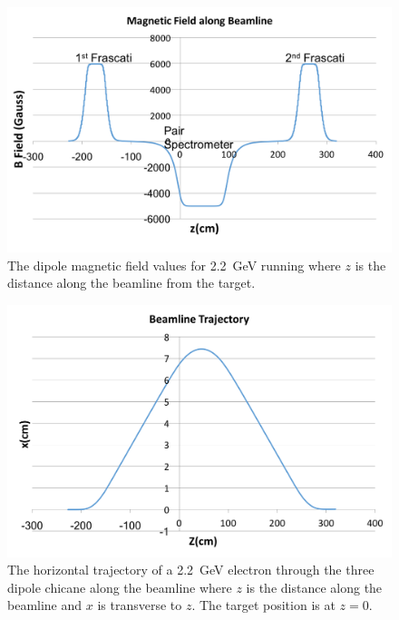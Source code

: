 \begin{figure}[htb]
  \centering
      \includegraphics[width=1.0\textwidth]{pics/experiment/bfield.png}
  \caption[HPS magnetic fields]{The dipole magnetic field values for 2.2~GeV running where $z$ is the distance along the beamline from the target.}
  \label{Figure:bField}
\end{figure}

\begin{figure}[htb]
  \centering
      \includegraphics[width=1.0\textwidth]{pics/experiment/feetrajectory.png}
  \caption[Charged particle trajectory in HPS beamline]{The horizontal trajectory of a 2.2~GeV electron through the three dipole chicane along the beamline where $z$ is the distance along the beamline and $x$ is transverse to $z$. The target position is at $z=0$.}
  \label{Figure:trajectory}
\end{figure}

